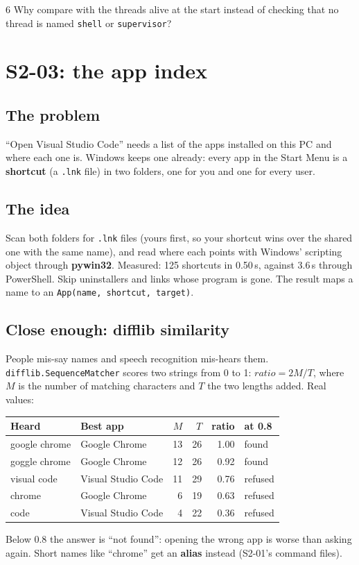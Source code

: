 \documentclass[11pt,a4paper]{article}
\begin{document}
\begin{quickcheck}{6}
Why compare with the threads alive at the start instead of checking that no thread is named
\texttt{shell} or \texttt{supervisor}?
\end{quickcheck}

\section{S2-03: the app index}
\subsection{The problem}
``Open Visual Studio Code'' needs a list of the apps installed on this PC and where each one is.
Windows keeps one already: every app in the Start Menu is a \textbf{shortcut} (a \texttt{.lnk}
file) in two folders, one for you and one for every user.

\subsection{The idea}
Scan both folders for \texttt{.lnk} files (yours first, so your shortcut wins over the shared one
with the same name), and read where each points with Windows' scripting object through
\textbf{pywin32}. Measured: 125 shortcuts in 0.50\,s, against 3.6\,s through PowerShell. Skip
uninstallers and links whose program is gone. The result maps a name to an \texttt{App(name,
shortcut, target)}.

\subsection{Close enough: difflib similarity}
People mis-say names and speech recognition mis-hears them. \texttt{difflib.SequenceMatcher}
scores two strings from 0 to 1: $\textit{ratio} = 2M/T$, where $M$ is the number of matching
characters and $T$ the two lengths added. Real values:
\begin{center}
\begin{tabular}{l l r r r l}
\toprule
\textbf{Heard} & \textbf{Best app} & $M$ & $T$ & \textbf{ratio} & \textbf{at 0.8} \\
\midrule
google chrome & Google Chrome & 13 & 26 & 1.00 & found \\
goggle chrome & Google Chrome & 12 & 26 & 0.92 & found \\
visual code & Visual Studio Code & 11 & 29 & 0.76 & refused \\
chrome & Google Chrome & 6 & 19 & 0.63 & refused \\
code & Visual Studio Code & 4 & 22 & 0.36 & refused \\
\bottomrule
\end{tabular}
\end{center}
\noindent Below 0.8 the answer is ``not found'': opening the wrong app is worse than asking again.
Short names like ``chrome'' get an \textbf{alias} instead (S2-01's command files).
\end{document}
